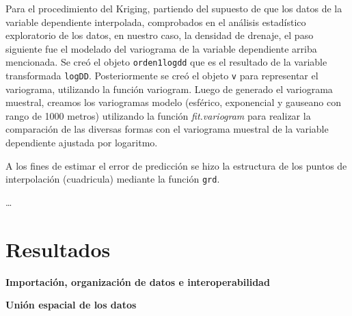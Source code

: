 \documentclass[11pt,]{article}
\begin{document}
Para el procedimiento del Kriging, partiendo del supuesto de que los
datos de la variable dependiente interpolada, comprobados en el análisis
estadístico exploratorio de los datos, en nuestro caso, la densidad de
drenaje, el paso siguiente fue el modelado del variograma de la variable
dependiente arriba mencionada. Se creó el objeto \texttt{orden1logdd}
que es el resultado de la variable transformada \texttt{logDD}.
Posteriormente se creó el objeto \texttt{v} para representar el
variograma, utilizando la función variogram. Luego de generado el
variograma muestral, creamos los variogramas modelo (esférico,
exponencial y gauseano con rango de 1000 metros) utilizando la función
\emph{fit.variogram} para realizar la comparación de las diversas formas
con el variograma muestral de la variable dependiente ajustada por
logaritmo.

A los fines de estimar el error de predicción se hizo la estructura de
los puntos de interpolación (cuadricula) mediante la función
\texttt{grd}.

\ldots

\section{Resultados}\label{resultados}

\textbf{Importación, organización de datos e interoperabilidad}

\textbf{Unión espacial de los datos}
\end{document}
